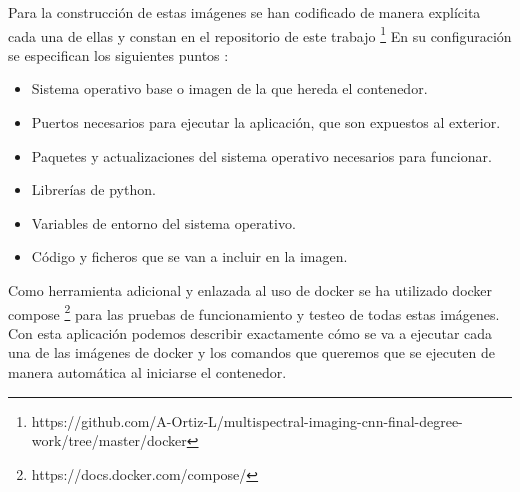 Para la construcción de estas imágenes se han codificado de manera explícita cada una de ellas y constan en el repositorio de este trabajo \footnote{https://github.com/A-Ortiz-L/multispectral-imaging-cnn-final-degree-work/tree/master/docker}
En su configuración se especifican los siguientes puntos :
\begin{itemize}
    \item Sistema operativo base o imagen de la que hereda el contenedor.
    \item Puertos necesarios para ejecutar la aplicación, que son expuestos al exterior.
    \item Paquetes y actualizaciones del sistema operativo necesarios para funcionar.
    \item Librerías de python.
    \item Variables de entorno del sistema operativo.
    \item Código y ficheros que se van a incluir en la imagen.
\end{itemize}
Como herramienta adicional y enlazada al uso de docker se ha utilizado docker compose \footnote{https://docs.docker.com/compose/} para las pruebas de funcionamiento y testeo de todas estas imágenes.
Con esta aplicación podemos describir exactamente cómo se va a ejecutar cada una de las imágenes de docker y los comandos que queremos que se ejecuten de manera automática al iniciarse el contenedor.